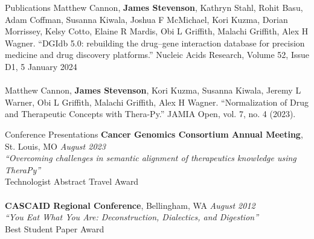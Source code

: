 \documentclass{cv} %
\begin{document}

\begin{rSection}{Publications}
{Matthew Cannon, \textbf{James Stevenson}, Kathryn Stahl, Rohit Basu, Adam Coffman, Susanna Kiwala, Joshua F McMichael, Kori Kuzma, Dorian Morrissey, Kelsy Cotto, Elaine R Mardis, Obi L Griffith, Malachi Griffith, Alex H Wagner. ``DGIdb 5.0: rebuilding the drug–gene interaction database for precision medicine and drug discovery platforms.'' Nucleic Acids Research, Volume 52, Issue D1, 5 January 2024}\\
\\
{Matthew Cannon, \textbf{James Stevenson}, Kori Kuzma, Susanna Kiwala, Jeremy L Warner, Obi L Griffith, Malachi Griffith, Alex H Wagner. ``Normalization of Drug and Therapeutic Concepts with Thera-Py.'' JAMIA Open, vol. 7, no. 4 (2023).}
\end{rSection}


\begin{rSection}{Conference Presentations}
\textbf{Cancer Genomics Consortium Annual Meeting}{, St. Louis, MO} \hfill {\em August 2023}\\
{\em ``Overcoming challenges in semantic alignment of therapeutics knowledge using TheraPy''}\\
{Technologist Abstract Travel Award}\\
\\
\textbf{CASCAID Regional Conference}{, Bellingham, WA} \hfill {\em August 2012}\\
{\em ``You Eat What You Are: Deconstruction, Dialectics, and Digestion''}\\
{Best Student Paper Award}

\end{rSection}

\end{document}
